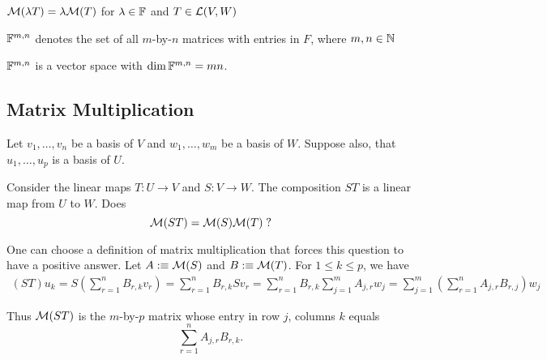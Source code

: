 \setcounter{thm}{37}
\begin{thm}
  $\mathcal{M}(\lambda T) = \lambda \mathcal{M}(T)$ for $\lambda \in \mathbb{F}$ and $T \in \mathcal{L} (V,W)$
\end{thm}

\begin{mydef} 
  $\mathbb{F}^{m,n}$ denotes the set of all $m$-by-$n$ matrices with entries in $F$, where $m,n \in \mathbb{N}$
\end{mydef}

\begin{thm} %
  $\mathbb{F}^{m,n}$ is a vector space with $\dim \mathbb{F}^{m,n}=mn$.
\end{thm}


\subsection{Matrix Multiplication}

Let $v_1, \ldots, v_n$ be a basis of $V$ and $w_1, \ldots, w_m$ be a basis of $W.$ Suppose also, that $u_1, \ldots, u_p$ is a basis of $U$.

Consider the linear maps $T: U \to V$ and $S: V \to W$. The composition $ST$ is a linear map from $U$ to $W$. Does
\begin{equation}
  \mathcal{M}(ST) = \mathcal{M}(S) \mathcal{M}(T) \;?
\end{equation}

One can choose a definition of matrix multiplication that forces this question to have a positive answer. Let $A :\equiv \mathcal{M}(S)$ and $B :\equiv \mathcal{M}(T)$. For $1 \leq k \leq p$, we have
\begin{equation}
  \begin{aligned}
    (ST) u_k 
    = S \left ( \sum_{r=1}^{n} B_{r,k} v_r \right )
    =  \sum_{r=1}^{n} B_{r,k} S v_r 
    =  \sum_{r=1}^{n} B_{r,k} \sum_{j=1}^{m} A_{j,r}  w_j 
    =  \sum_{j=1}^{m} \left( \sum_{r=1}^{n} A_{j,r}  B_{r,j} \right) w_j 
  \end{aligned}
\end{equation}

Thus $\mathcal{M}(ST)$ is the $m$-by-$p$ matrix whose entry in row $j$, columns $k$ equals 
\begin{equation}
  \sum_{r=1}^{n} A_{j,r}  B_{r,k}.
\end{equation}

